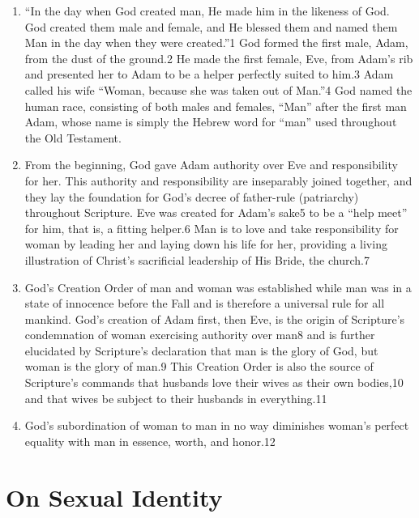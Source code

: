 \documentclass[
]{book}
\begin{document}
\begin{enumerate}
\def\labelenumi{\arabic{enumi}.}
\item
  ``In the day when God created man, He made him in the likeness of God. God created them male and female, and He blessed them and named them Man in the day when they were created.''1 God formed the first male, Adam, from the dust of the ground.2 He made the first female, Eve, from Adam's rib and presented her to Adam to be a helper perfectly suited to him.3 Adam called his wife ``Woman, because she was taken out of Man.''4 God named the human race, consisting of both males and females, ``Man'' after the first man Adam, whose name is simply the Hebrew word for ``man'' used throughout the Old Testament.
\item
  From the beginning, God gave Adam authority over Eve and responsibility for her. This authority and responsibility are inseparably joined together, and they lay the foundation for God's decree of father-rule (patriarchy) throughout Scripture. Eve was created for Adam's sake5 to be a ``help meet'' for him, that is, a fitting helper.6 Man is to love and take responsibility for woman by leading her and laying down his life for her, providing a living illustration of Christ's sacrificial leadership of His Bride, the church.7
\item
  God's Creation Order of man and woman was established while man was in a state of innocence before the Fall and is therefore a universal rule for all mankind. God's creation of Adam first, then Eve, is the origin of Scripture's condemnation of woman exercising authority over man8 and is further elucidated by Scripture's declaration that man is the glory of God, but woman is the glory of man.9 This Creation Order is also the source of Scripture's commands that husbands love their wives as their own bodies,10 and that wives be subject to their husbands in everything.11
\item
  God's subordination of woman to man in no way diminishes woman's perfect equality with man in essence, worth, and honor.12
\end{enumerate}

\hypertarget{on-sexual-identity}{%
\section*{On Sexual Identity}\label{on-sexual-identity}}
\end{document}
